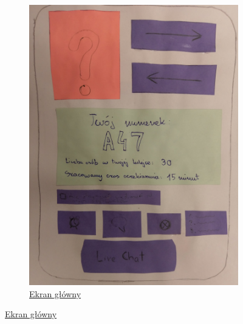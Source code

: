 \documentclass[12pt]{article}
\begin{document}
\begin{figure}[h!]
\begin{subfigure}[ba]{1\linewidth}
	\includegraphics[width=\linewidth]{zdj/4.jpg}
	\caption{\underline{Ekran główny}}
\end{subfigure}
\end{figure}
\end{document}
